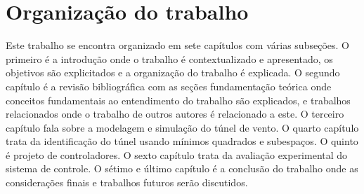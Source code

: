 \section{Organização do trabalho}


Este trabalho se encontra organizado em sete capítulos com várias subseções. O primeiro é a introdução onde o trabalho é contextualizado e apresentado, os objetivos são explicitados e a organização do trabalho é explicada. O segundo capítulo é a revisão bibliográfica com as seções fundamentação teórica onde conceitos fundamentais ao entendimento do trabalho são explicados, e trabalhos relacionados onde o trabalho de outros autores é relacionado a este. O terceiro capítulo fala sobre a modelagem e simulação do túnel de vento. O quarto capítulo trata da identificação do túnel usando mínimos quadrados e subespaços. O quinto é projeto de controladores. O sexto capítulo trata da avaliação experimental do sistema de controle. O sétimo e último capítulo é a conclusão do trabalho onde as considerações finais e trabalhos futuros serão discutidos.

